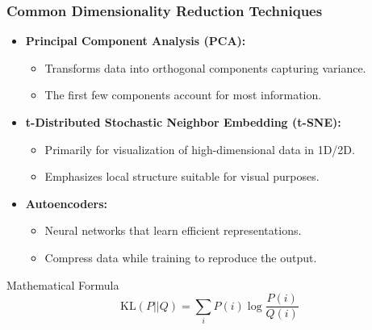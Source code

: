 \documentclass[aspectratio=169]{beamer}
\begin{document}
\begin{frame}[fragile]
    \frametitle{Common Dimensionality Reduction Techniques}

    \begin{itemize}
        \item \textbf{Principal Component Analysis (PCA):}
            \begin{itemize}
                \item Transforms data into orthogonal components capturing variance.
                \item The first few components account for most information.
            \end{itemize}
        
        \item \textbf{t-Distributed Stochastic Neighbor Embedding (t-SNE):}
            \begin{itemize}
                \item Primarily for visualization of high-dimensional data in 1D/2D.
                \item Emphasizes local structure suitable for visual purposes.
            \end{itemize}
        
        \item \textbf{Autoencoders:}
            \begin{itemize}
                \item Neural networks that learn efficient representations.
                \item Compress data while training to reproduce the output.
            \end{itemize}
    \end{itemize}

    \begin{block}{Mathematical Formula}
        \[\text{KL}(P || Q) = \sum_{i} P(i) \log \frac{P(i)}{Q(i)}\]
    \end{block}
\end{frame}
\end{document}
